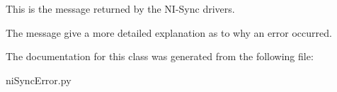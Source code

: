 This is the message returned by the N\-I-\/\-Sync drivers. 

The message give a more detailed explanation as to why an error occurred. 

The documentation for this class was generated from the following file\-:\begin{DoxyCompactItemize}
\item 
ni\-Sync\-Error.\-py\end{DoxyCompactItemize}
